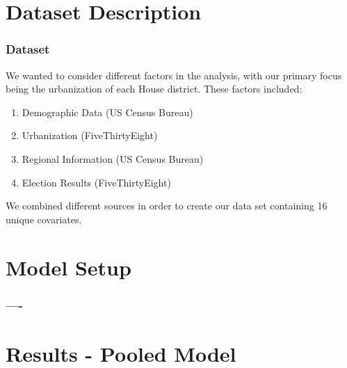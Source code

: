 \documentclass{beamer}
\begin{document}
\section{Dataset Description}
\begin{frame}
\frametitle{Dataset}
We wanted to consider different factors in the analysis, with our primary focus being the urbanization of each House district. These factors included: 
\begin{enumerate}
  \item Demographic Data (US Census Bureau)
  \item Urbanization (FiveThirtyEight)
  \item Regional Information (US Census Bureau)
  \item Election Results (FiveThirtyEight)
\end{enumerate}
We combined different sources in order to create our data set containing 16 unique covariates.
\end{frame}  






\section{Model Setup}

\begin{frame}
\frametitle{----}

\end{frame}


\section{Results - Pooled Model}
\end{document}
